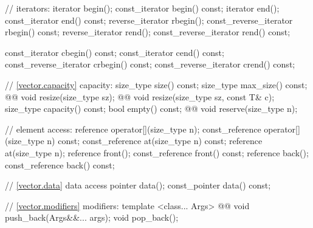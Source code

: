 \documentclass[american,twoside]{book}
\begin{document}
\begin{codeblock}
{{    // iterators:
    iterator               begin();
    const_iterator         begin() const;
    iterator               end();
    const_iterator         end() const;
    reverse_iterator       rbegin();
    const_reverse_iterator rbegin() const;
    reverse_iterator       rend();
    const_reverse_iterator rend() const;

    const_iterator         cbegin() const;
    const_iterator         cend() const;
    const_reverse_iterator crbegin() const;
    const_reverse_iterator crend() const;

    // \ref{vector.capacity} capacity:
    size_type size() const;
    size_type max_size() const;
    @@ 
      void resize(size_type sz);
    @@ void resize(size_type sz, const T& c);
    size_type capacity() const;
    bool      empty() const;
    @@ void reserve(size_type n);

    // element access:
    reference       operator[](size_type n);
    const_reference operator[](size_type n) const;
    const_reference at(size_type n) const;
    reference       at(size_type n);
    reference       front();
    const_reference front() const;
    reference       back();
    const_reference back() const;

    // \ref{vector.data} data access
    pointer         data();
    const_pointer   data() const;

    // \ref{vector.modifiers} modifiers:
    template <class... Args> 
      @@
      void push_back(Args&&... args);
    void pop_back();

}}
\end{codeblock}
\end{document}
